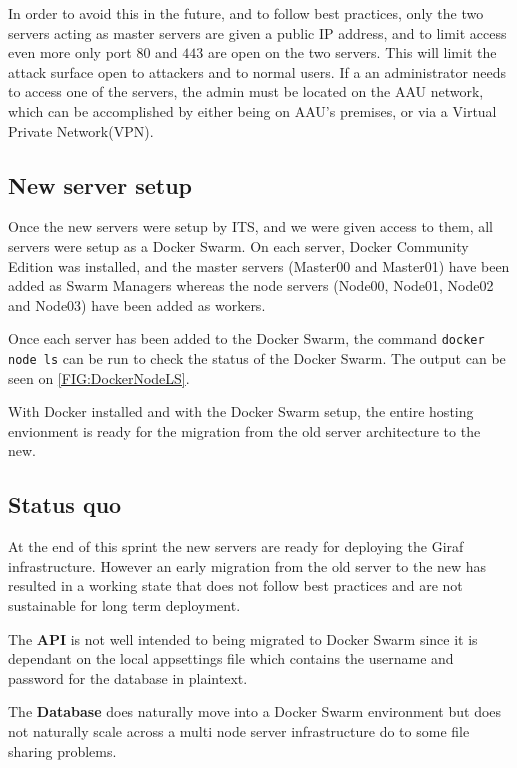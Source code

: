 In order to avoid this in the future, and to follow best practices, only the two servers acting as master servers are given a public IP address, and to limit access even more only port $80$ and $443$ are open on the two servers. 
This will limit the attack surface open to attackers and to normal users. 
If a an administrator needs to access one of the servers, the admin must be located on the AAU network, which can be accomplished by either being on AAU's premises, or via a Virtual Private Network(VPN).

\subsection{New server setup}

Once the new servers were setup by ITS, and we were given access to them, all servers were setup as a Docker Swarm. 
On each server, Docker Community Edition was installed, and the master servers (Master00 and Master01) have been added as Swarm Managers whereas the node servers (Node00, Node01, Node02 and Node03) have been added as workers. 

Once each server has been added to the Docker Swarm, the command \lstinline[columns=fixed]{docker node ls} can be run to check the status of the Docker Swarm.
The output can be seen on \autoref{FIG:DockerNodeLS}.

With Docker installed and with the Docker Swarm setup, the entire hosting envionment is ready for the migration from the old server architecture to the new.

\subsection{Status quo}
At the end of this sprint the new servers are ready for deploying the Giraf infrastructure. 
However an early migration from the old server to the new has resulted in a working state that does not follow best practices and are not sustainable for long term deployment. 

The \textbf{API} is not well intended to being migrated to Docker Swarm since it is dependant on the local appsettings file which contains the username and password for the database in plaintext. 

The \textbf{Database} does naturally move into a Docker Swarm environment but does not naturally scale across a multi node server infrastructure do to some file sharing problems. 

